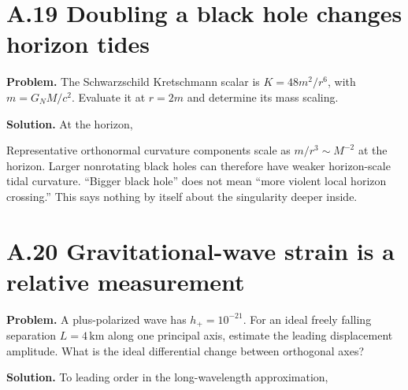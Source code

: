 \documentclass[
  11pt,
  letterpaper,
  oneside,
  openany]{scrbook}
\begin{document}
\hypertarget{a.19-doubling-a-black-hole-changes-horizon-tides}{%
\section{A.19 Doubling a black hole changes horizon
tides}\label{a.19-doubling-a-black-hole-changes-horizon-tides}}

\textbf{Problem.} The Schwarzschild Kretschmann scalar is
\(K=48m^2/r^6\), with \(m=G_NM/c^2\). Evaluate it at \(r=2m\) and
determine its mass scaling.

\textbf{Solution.} At the horizon,

\begin{center}
\begingroup
{}
\ifdim\wd\grmathbox>\linewidth
\resizebox{\linewidth}{!}{\usebox{\grmathbox}}
\else\usebox{\grmathbox}\fi
\endgroup
\end{center}

Representative orthonormal curvature components scale as
\(m/r^3\sim M^{-2}\) at the horizon. Larger nonrotating black holes can
therefore have weaker horizon-scale tidal curvature. ``Bigger black
hole'' does not mean ``more violent local horizon crossing.'' This says
nothing by itself about the singularity deeper inside.

\hypertarget{a.20-gravitational-wave-strain-is-a-relative-measurement}{%
\section{A.20 Gravitational-wave strain is a relative
measurement}\label{a.20-gravitational-wave-strain-is-a-relative-measurement}}

\textbf{Problem.} A plus-polarized wave has \(h_+=10^{-21}\). For an
ideal freely falling separation \(L=4\,\mathrm{km}\) along one principal
axis, estimate the leading displacement amplitude. What is the ideal
differential change between orthogonal axes?

\textbf{Solution.} To leading order in the long-wavelength
approximation,

\begin{center}
\begingroup
{}
\ifdim\wd\grmathbox>\linewidth
\resizebox{\linewidth}{!}{\usebox{\grmathbox}}
\else\usebox{\grmathbox}\fi
\endgroup
\end{center}
\end{document}
